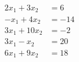 \begin{align*}
2x_1  + 3x_2  &= 6 \\
-x_1 + 4x_2  &=  -14 \\
3x_1 +10x_2  &=  -2  \\
3x_1 - x_2  &=  20  \\
6x_1 + 9x_2  &=  18  
\end{align*}